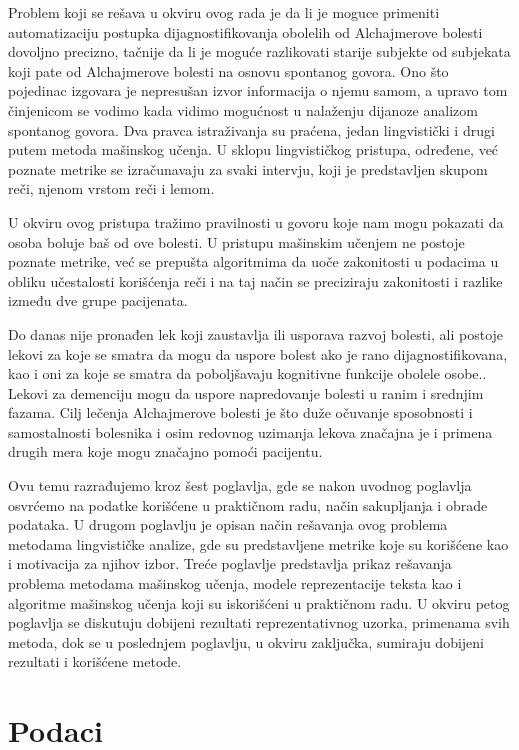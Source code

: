 \documentclass[12pt,oneside]{memoir}
\begin{document}
Problem koji se rešava u okviru ovog rada je da li je moguce primeniti automatizaciju postupka dijagnostifikovanja obolelih od Alchajmerove bolesti dovoljno precizno, tačnije da li je moguće razlikovati starije subjekte od subjekata koji pate od  Alchajmerove bolesti na osnovu spontanog govora.  Ono što pojedinac izgovara je nepresušan izvor informacija o njemu samom,  a upravo tom činjenicom se vodimo kada vidimo mogućnost u nalaženju dijanoze analizom spontanog govora.  Dva pravca istraživanja su praćena,  jedan lingvistički i drugi putem metoda mašinskog učenja.  U sklopu lingvističkog pristupa,  određene,  već poznate metrike se izračunavaju za svaki intervju,  koji je predstavljen skupom reči,  njenom vrstom reči i lemom.  

U okviru ovog pristupa tražimo pravilnosti u govoru koje nam mogu pokazati da osoba boluje baš od ove bolesti.  U pristupu mašinskim učenjem ne postoje poznate metrike,  već se prepušta algoritmima da uoče zakonitosti u podacima u obliku učestalosti korišćenja reči i na taj način se preciziraju zakonitosti i razlike između dve grupe pacijenata. 

Do danas nije pronađen lek koji zaustavlja ili usporava razvoj bolesti, ali postoje lekovi za koje se smatra da mogu da uspore bolest ako je rano dijagnostifikovana, kao i oni za koje se smatra da poboljšavaju kognitivne funkcije obolele osobe.\cite{Alzheimerfactsfigures}.  Lekovi za demenciju mogu da uspore napredovanje bolesti u ranim i srednjim fazama.  Cilj lečenja Alchajmerove bolesti je što duže očuvanje sposobnosti i samostalnosti bolesnika i osim redovnog uzimanja lekova značajna je i primena drugih mera koje mogu značajno pomoći pacijentu\cite{medicor}.

Ovu temu razrađujemo kroz šest poglavlja, gde se nakon uvodnog poglavlja osvrćemo na podatke korišćene u praktičnom radu, način sakupljanja i obrade podataka.  U drugom poglavlju je opisan način rešavanja ovog problema metodama lingvističke analize,  gde su predstavljene metrike koje su korišćene kao i motivacija za njihov izbor. Treće poglavlje predstavlja prikaz rešavanja problema metodama mašinskog učenja,  modele reprezentacije teksta kao i algoritme mašinskog učenja koji su iskorišćeni u praktičnom radu.  U okviru petog poglavlja se diskutuju dobijeni rezultati reprezentativnog uzorka,  primenama svih metoda, dok se u poslednjem poglavlju,  u okviru zaključka,  sumiraju dobijeni rezultati i korišćene metode. 


\chapter{Podaci}
\end{document}
